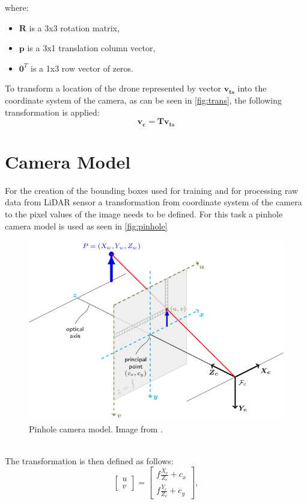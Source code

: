 \documentclass[twoside]{ctuthesis}
\theoremstyle{plain}
\theoremstyle{definition}
\theoremstyle{note}
\begin{document}
where:
\begin{itemize}
	\item $\textbf{R}$ is a 3x3 rotation matrix,
	\item $\textbf{p}$ is a 3x1 translation column vector,
	\item $\textbf{0}^T$ is a 1x3 row vector of zeros.
\end{itemize}
To transform a location of the drone represented by vector $\mathbf{v_{ts}}$ into the coordinate system of the camera, as can be seen in \autoref{fig:trans}, the following transformation is applied:
\begin{equation}
	\mathbf{v_c}=\mathbf{T}\mathbf{v_{ts}}
\end{equation}
\section{Camera Model} \label{sec:camera-model}
For the creation of the bounding boxes used for training and for processing raw data from LiDAR sensor a transformation from coordinate system of the camera to the pixel values of the image needs to be defined. For this task a pinhole camera model is used as seen in \autoref{fig:pinhole}
\begin{figure}
	\centering
	\includegraphics[width=\textwidth]{pinhole_camera_model.png}
	\caption{Pinhole camera model. Image from \cite{opencv}.}
	\label{fig:pinhole}
\end{figure}\\
The transformation is then defined as follows:
\begin{equation} \label{eq:2}
	\begin{bmatrix}
		u\\
		v
	\end{bmatrix}=
	\begin{bmatrix}
		f\frac{X_c}{Z_c}+c_x\\
		f\frac{Y_c}{Z_c}+c_y
	\end{bmatrix},
\end{equation}
\end{document}
